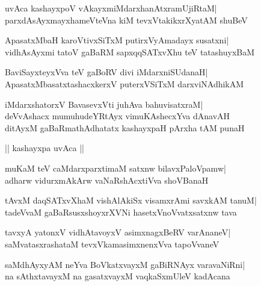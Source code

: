 \documentclass[twoside,12pt,openright]{book}
\newcounter{shloka}[chapter]
\begin{document}
\begin{shloka}%
uvAca kashayxpoV vAkayxmiMdarxhanAtxramUjiRtaM|\\
parxdAsAyxmayxhameVteVna kiM tevxVtakikxrXyatAM shuBeV
\end{shloka}

\begin{shloka}%
ApasatxMbaH karoVtivxSiTxM putirxVyAmadayx susatxni|\\
vidhAsAyxmi tatoV gaBaRM sapxqqSATxvXhu teV tatashuyxBaM
\end{shloka}

\begin{shloka}%
BaviSayxteyxVva teV gaBoRV divi iMdarxniSUdanaH|\\
ApasatxMbasatxtashacxkerxV puterxVSiTxM darxviNAdhikAM
\end{shloka}

\begin{shloka}%
iMdarxshatorxV BavasevxVti juhAva bahuvisatxraM|\\
deVvAshacx mumuhudeYRtAyx vimuKAshecxYva dAnavAH\\
ditAyxM gaBaRmathAdhatatx kashayxpaH pArxha tAM punaH
\end{shloka}

\begin{center}
|| kashayxpa uvAca ||
\end{center}
\begin{shloka}%
muKaM teV caMdarxparxtimaM satxnw bilavxPaloVpamw|\\
adharw vidurxmAkArw vaNaRshAcxtiVva shoVBanaH
\end{shloka}

\begin{shloka}%
tAvxM daqSATxvXhaM vishAlAkiSx visamxrAmi savxkAM tanuM|\\
tadeVvaM gaBaRsusxshoyxrXVNi hasetxVnoVvatxsatxnw tava
\end{shloka}

\begin{shloka}%
tavxyA yatonxV vidhAtavoyxV asimxnagxBeRV varAnaneV|\\
saMvatasxrashataM tevxVkamasimxnenxVva tapoVvaneV
\end{shloka}

\begin{shloka}%
saMdhAyxyAM neYva BoVkatxvayxM gaBiRNAyx varavaNiRni|\\
na sAthxtavayxM na gasatxvayxM vaqkaSxmUleV kadAcana
\end{shloka}
\end{document}
